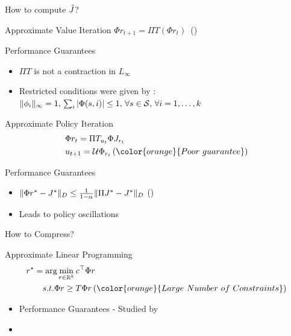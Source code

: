 \documentclass[10pt,handout]{beamer}
\begin{document}
\begin{frame}[fragile]{How to compute $\tilde{J}$?}

 Approximate Value Iteration{\color{orange}} $\Phi r_{t+1}= \Pi T (\Phi r_t)$ \,({\color{orange}{No fixed point}})

\begin{block}{Performance Guarantees}
\begin{itemize}
\item $\Pi T$ is not a contraction in $L_\infty$
\item Restricted conditions were given by \cite{melo2007q}:
$\|\phi_i\|_\infty=1,\, \sum_i |\Phi(s,i)|\leq 1,\,\forall s\in \mathcal{S}, \,\forall i=1,\ldots,k$
\end{itemize}
\end{block}


{Approximate Policy Iteration}{\color{orange}}
\begin{align*}
&\Phi r_t=\Pi T_{u_t} \Phi J_{r_t} \\
&u_{t+1}=\U \Phi_{r_t}\,\text({\color{orange}{Poor~guarantee}})
\end{align*}

\begin{block}{Performance Guarantees}
\begin{itemize}
\item $\|\Phi r^*-J^*\|_D\leq \frac{1}{1-\alpha}\|\Pi J^*-J^*\|_D$ ({\color{orange}{Norm Mismatch}})
\item Leads to policy oscillations
\end{itemize}
\end{block}



\end{frame}

\begin{frame}[fragile]{How to Compress?}
\begin{block}{Approximate Linear Programming \cite{schweitzer1985generalized} {\color{orange}}}
\begin{align*}
 r^*&=\arg\min_{r\in \R^{k}} c^\top \Phi r\\
&\quad s.t. \Phi r\geq T \Phi r \,({\color{orange}{Large~Number~of~Constraints}})
\end{align*}
\end{block}
\begin{itemize}
\item Performance Guarantees - Studied by \cite{de2003linear}
\item {\color{orange}{What happens if we reduce constraints?}}
\end{itemize}
\end{frame}
\end{document}
